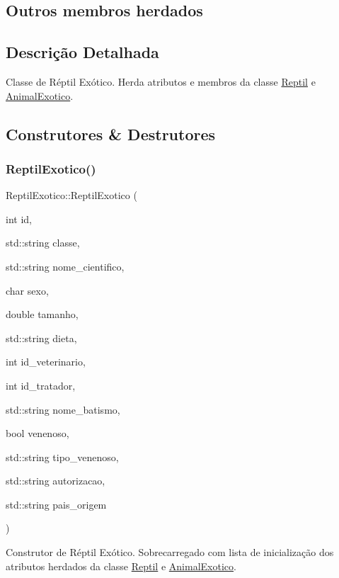 \subsection*{Outros membros herdados}


\subsection{Descrição Detalhada}
Classe de Réptil Exótico. Herda atributos e membros da classe \hyperlink{classReptil}{Reptil} e \hyperlink{classAnimalExotico}{Animal\+Exotico}. 

\subsection{Construtores \& Destrutores}
\mbox{\label{classReptilExotico_a2a7126e82ab5b10ff0c1af3c827e0c36}} 
\subsubsection{\texorpdfstring{Reptil\+Exotico()}{ReptilExotico()}}
{\footnotesize\ttfamily Reptil\+Exotico\+::\+Reptil\+Exotico (\begin{DoxyParamCaption}\item[{int}]{id,  }\item[{std\+::string}]{classe,  }\item[{std\+::string}]{nome\+\_\+cientifico,  }\item[{char}]{sexo,  }\item[{double}]{tamanho,  }\item[{std\+::string}]{dieta,  }\item[{int}]{id\+\_\+veterinario,  }\item[{int}]{id\+\_\+tratador,  }\item[{std\+::string}]{nome\+\_\+batismo,  }\item[{bool}]{venenoso,  }\item[{std\+::string}]{tipo\+\_\+venenoso,  }\item[{std\+::string}]{autorizacao,  }\item[{std\+::string}]{pais\+\_\+origem }\end{DoxyParamCaption})}

Construtor de Réptil Exótico. Sobrecarregado com lista de inicialização dos atributos herdados da classe \hyperlink{classReptil}{Reptil} e \hyperlink{classAnimalExotico}{Animal\+Exotico}. \mbox{\label{classReptilExotico_abddaff7d11fd31ce5fcd4a2c1b4ee6f1}} 
